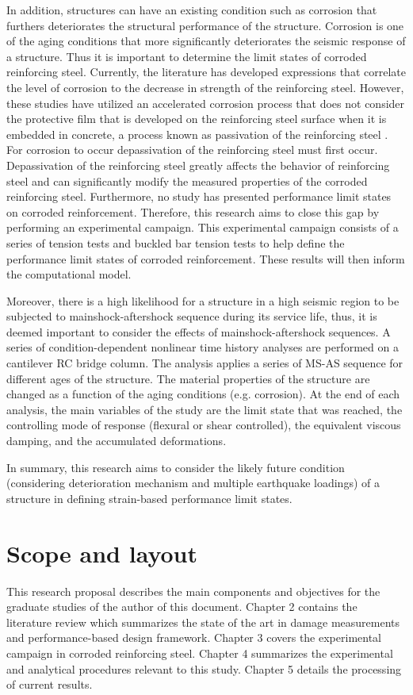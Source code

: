 In addition, structures can have an existing condition such as corrosion that furthers deteriorates the structural performance of the structure. Corrosion is one of the aging conditions that more significantly deteriorates the seismic response of a structure. Thus it is important to determine the limit states of corroded reinforcing steel. Currently, the literature has developed expressions that correlate the level of corrosion to the decrease in strength of the reinforcing steel\cite{Yuan2017a}\cite{Du2005}. However, these studies have utilized an accelerated corrosion process that does not consider the protective film that is developed on the reinforcing steel surface when it is embedded in concrete, a process known as passivation of the reinforcing steel \cite{Mehta2014}\cite{Ghods2009}. For corrosion to occur depassivation of the reinforcing steel must first occur. Depassivation of the reinforcing steel greatly affects the behavior of reinforcing steel and can significantly modify the measured properties of the corroded reinforcing steel. Furthermore, no study has presented performance limit states on corroded reinforcement. Therefore, this research aims to close this gap by performing an experimental campaign. This experimental campaign consists of a series of tension tests and buckled bar tension tests to help define the performance limit states of corroded reinforcement. These results will then inform the computational model.

Moreover, there is a high likelihood for a structure in a high seismic region to be subjected to mainshock-aftershock sequence during its service life, thus, it is deemed important to consider the effects of mainshock-aftershock sequences. A series of condition-dependent nonlinear time history analyses are performed on a cantilever RC bridge column. The analysis applies a series of MS-AS sequence for different ages of the structure. The material properties of the structure are changed as a function of the aging conditions (e.g. corrosion). At the end of each analysis, the main variables of the study are the limit state that was reached, the controlling mode of response (flexural or shear controlled), the equivalent viscous damping, and the accumulated deformations.

In summary, this research aims to consider the likely future condition (considering deterioration mechanism and multiple earthquake loadings) of a structure in defining strain-based performance limit states.

\section{Scope and layout}
This research proposal describes the main components and objectives for the graduate studies of the author of this document. Chapter 2 contains the literature review which summarizes the state of the art in damage measurements and performance-based design framework. Chapter 3 covers the experimental campaign in corroded reinforcing steel. Chapter 4 summarizes the experimental and analytical procedures relevant to this study. Chapter 5 details the processing of current results. 